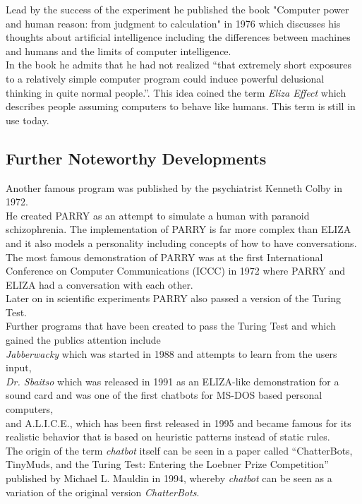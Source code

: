 Lead by the success of the experiment he published the book "Computer power and human reason: from judgment to calculation" in 1976 which discusses his thoughts about artificial intelligence including the differences between machines and humans and the limits of computer intelligence.
\\
In the book he admits that he had not realized ``that extremely short exposures to a relatively simple computer program could induce powerful delusional thinking in quite normal people.''\cite{bbcnowthen}. This idea coined the term \emph{Eliza Effect} which describes people assuming computers to behave like humans. This term is still in use today.


\subsection{Further Noteworthy Developments}

Another famous program was published by the psychiatrist Kenneth Colby in 1972.
\\
He created PARRY as an attempt to simulate a human with paranoid schizophrenia. The implementation of PARRY is far more complex than ELIZA and it also models a personality including concepts of how to have conversations.
\\
The most famous demonstration of PARRY was at the first International Conference on Computer Communications (ICCC) in 1972 where PARRY and ELIZA had a conversation with each other.\cite{internethistory}
\\
Later on in scientific experiments PARRY also passed a version of the Turing Test.
\\

Further programs that have been created to pass the Turing Test and which gained the publics attention include
\\
\emph{Jabberwacky} which was started in 1988 and attempts to learn from the users input\cite{jabberwacky},
\\
\emph{Dr. Sbaitso} which was released in 1991 as an ELIZA-like demonstration for a sound card and was one of the first chatbots for MS-DOS based personal computers\cite{pcmag},
\\
and A.L.I.C.E., which has been first released in 1995 and became famous for its realistic behavior that is based on heuristic patterns instead of static rules\cite{approximatinglife}.
\\

The origin of the term \emph{chatbot} itself can be seen in a paper called ``ChatterBots, TinyMuds, and the Turing Test: Entering the Loebner Prize Competition'' published by Michael L. Mauldin in 1994, whereby \emph{chatbot} can be seen as a variation of the original version \emph{ChatterBots}.\cite{aiconf}
\\

